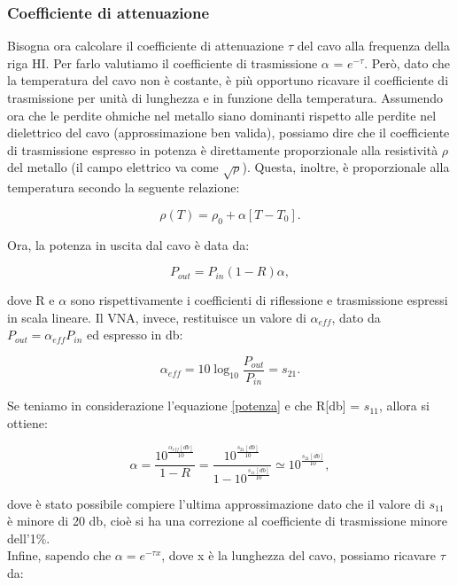 \subsubsection{Coefficiente di attenuazione}
\label{ssec:Coefficiente di attenuazione}

Bisogna ora calcolare il coefficiente di attenuazione $\tau$ del cavo alla frequenza della riga HI. Per farlo valutiamo il coefficiente di trasmissione $\alpha$ = $e^{-\tau}$. Però, dato che la temperatura del cavo non è costante, è più opportuno ricavare il coefficiente di trasmissione per unità di lunghezza e in funzione della temperatura. Assumendo ora che le perdite ohmiche nel metallo siano dominanti rispetto alle perdite nel dielettrico del cavo (approssimazione ben valida), possiamo dire che il coefficiente di trasmissione espresso in potenza è direttamente proporzionale alla resistività $\rho$ del metallo (il campo elettrico va come $\sqrt{\rho}$). Questa, inoltre, è proporzionale alla temperatura secondo la seguente relazione:

\begin{equation}
    \rho(T)=\rho_{0}+\alpha[T-T_{0}].
\end{equation}

Ora, la potenza in uscita dal cavo è data da:

\begin{equation}
    P_{out}=P_{in}(1-R)\alpha,
    \label{potenza}
\end{equation}

dove R e $\alpha$ sono rispettivamente i coefficienti di riflessione e trasmissione espressi in scala lineare. 
Il VNA, invece, restituisce un valore di $\alpha_{eff}$, dato da $P_{out}=\alpha_{eff}P_{in}$ ed espresso in db:

\begin{equation}
    \alpha_{eff}=10\log_{10}\frac{P_{out}}{P_{in}}=s_{21}.
\end{equation}

Se teniamo in considerazione l'equazione \eqref{potenza} e che R[db] 
=  $s_{11}$, allora si ottiene:

\begin{equation}
    \alpha=\frac{10^{\frac{\alpha_{eff}[db]}{10}}}{1-R}=\frac{10^{\frac{s_{21}[db]}{10}}}{1-10^{\frac{s_{11}[db]}{10}}}\simeq10^{\frac{s_{21}[db]}{10}},
\end{equation}

dove è stato possibile compiere l'ultima approssimazione dato che il valore di $s_{11}$ è minore di 20 db, cioè si ha una correzione al coefficiente di trasmissione minore dell'1$\%$.\\
Infine, sapendo che $\alpha = e^{-\tau x}$, dove x è la lunghezza del cavo, possiamo ricavare $\tau$ da:

